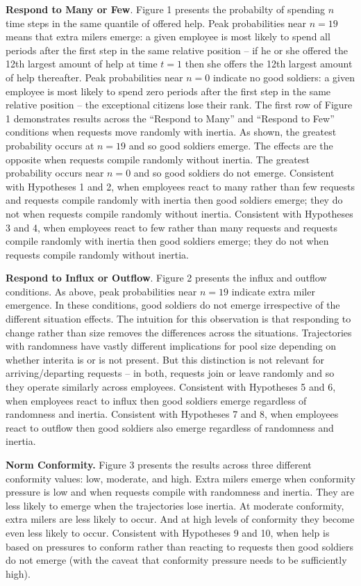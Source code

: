 \documentclass[english,,man]{apa6}
\begin{document}
\textbf{Respond to Many or Few}. Figure 1 presents the probabilty of spending \(n\) time steps in the same quantile of offered help. Peak probabilities near \(n = 19\) means that extra milers emerge: a given employee is most likely to spend all periods after the first step in the same relative position -- if he or she offered the 12th largest amount of help at time \(t = 1\) then she offers the 12th largest amount of help thereafter. Peak probabilities near \(n = 0\) indicate no good soldiers: a given employee is most likely to spend zero periods after the first step in the same relative position -- the exceptional citizens lose their rank. The first row of Figure 1 demonstrates results across the \enquote{Respond to Many} and \enquote{Respond to Few} conditions when requests move randomly with inertia. As shown, the greatest probability occurs at \(n = 19\) and so good soldiers emerge. The effects are the opposite when requests compile randomly without inertia. The greatest probability occurs near \(n = 0\) and so good soldiers do not emerge. Consistent with Hypotheses 1 and 2, when employees react to many rather than few requests and requests compile randomly with inertia then good soldiers emerge; they do not when requests compile randomly without inertia. Consistent with Hypotheses 3 and 4, when employees react to few rather than many requests and requests compile randomly with inertia then good soldiers emerge; they do not when requests compile randomly without inertia.

\textbf{Respond to Influx or Outflow}. Figure 2 presents the influx and outflow conditions. As above, peak probabilities near \(n = 19\) indicate extra miler emergence. In these conditions, good soldiers do not emerge irrespective of the different situation effects. The intuition for this observation is that responding to change rather than size removes the differences across the situations. Trajectories with randomness have vastly different implications for pool size depending on whether interita is or is not present. But this distinction is not relevant for arriving/departing requests -- in both, requests join or leave randomly and so they operate similarly across employees. Consistent with Hypotheses 5 and 6, when employees react to influx then good soldiers emerge regardless of randomness and inertia. Consistent with Hypotheses 7 and 8, when employees react to outflow then good soldiers also emerge regardless of randomness and inertia.

\textbf{Norm Conformity.} Figure 3 presents the results across three different conformity values: low, moderate, and high. Extra milers emerge when conformity pressure is low and when requests compile with randomness and inertia. They are less likely to emerge when the trajectories lose inertia. At moderate conformity, extra milers are less likely to occur. And at high levels of conformity they become even less likely to occur. Consistent with Hypotheses 9 and 10, when help is based on pressures to conform rather than reacting to requests then good soldiers do not emerge (with the caveat that conformity pressure needs to be sufficiently high).
\end{document}
